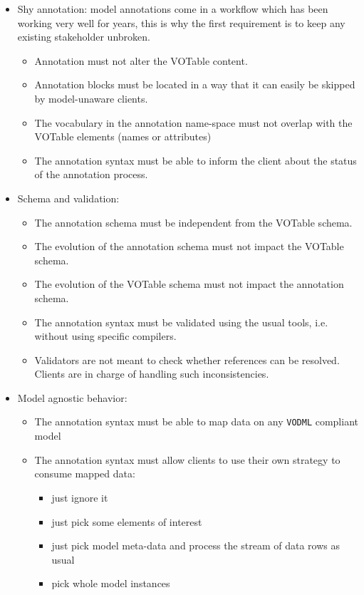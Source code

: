 \begin {itemize}
  \item Shy annotation: model annotations come in a workflow which has been working very well for years, this is why the first requirement is to keep any existing stakeholder unbroken.
  \begin {itemize}
    \item Annotation must not alter the VOTable content.
    \item Annotation blocks must be located in a way that it can easily be skipped by model-unaware clients.
    \item The vocabulary in the annotation name-space must not overlap with the VOTable elements (names or attributes)    
    \item The annotation syntax must be able to inform the client about the status of the annotation process.
  \end {itemize}
  
  \item Schema and validation:
  \begin {itemize}
    \item The annotation schema must be independent from the VOTable schema.
    \item The evolution of the annotation schema must not impact the VOTable schema.
    \item The evolution of the VOTable schema must not impact the annotation schema.
    \item The annotation syntax must be validated using the usual tools, i.e. without using specific compilers.
    \item Validators are not meant to check whether references can be resolved. Clients are in charge of handling such inconsistencies.
  \end {itemize}
  
  \item Model agnostic behavior:
  \begin {itemize}
    \item The annotation syntax must be able to map data on any \texttt{VODML} compliant model
    \item The annotation syntax must allow clients to use their own strategy to consume mapped data:
      \begin {itemize}
        \item just ignore it
        \item just pick some elements of interest 
        \item just pick model meta-data and process the stream of data rows as usual
        \item pick whole model instances
      \end {itemize}
  \end {itemize}
  

\end{itemize}
